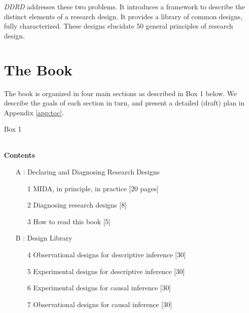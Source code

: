 \documentclass[11pt]{article}
\begin{document}
{\it DDRD} addresses these two problems. It introduces a framework to describe the distinct elements of a research design. It provides a library of common designs, fully characterized. These designs elucidate 50 general principles of research design.
\newpage
\section{The Book}

The book is organized in four main sections as described in Box 1 below. We describe the goals of each section in turn, and present a detailed (draft) plan in Appendix \ref{app:toc}.

\begin{framed}
\begin{centering} Box 1 \end{centering}\\

	\noindent\textbf{Contents}
	\begin{enumerate}
		\item[A]: Declaring and Diagnosing Research Designs
		
		\begin{enumerate}
			\item[1] MIDA, in principle, in practice [20 pages]
			\item[2] Diagnosing research designs [8]
			\item[3] How to read this book [5]
		\end{enumerate}
		
		\item[B]: Design Library
		\begin{enumerate}
			\item[4] Observational designs for descriptive inference [30]
			\item[5] Experimental designs for descriptive inference [30]
			\item[6] Experimental designs for causal inference [30]
			\item[7] Observational designs for causal inference [30]
		\end{enumerate}
		

\end{enumerate}
\end{framed}
\end{document}
